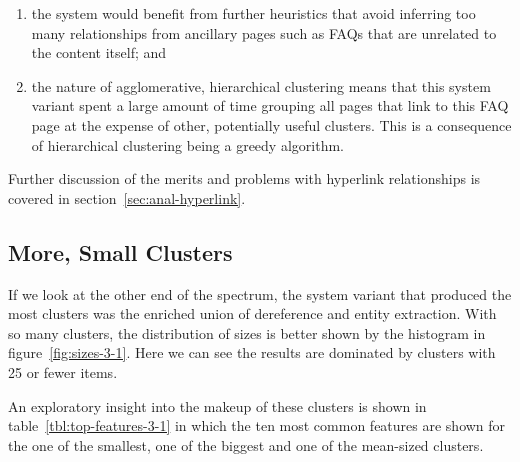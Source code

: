 \begin{enumerate}
\item the system would benefit from further heuristics that avoid
  inferring too many relationships from ancillary pages such as FAQs
  that are unrelated to the content itself; and
\item the nature of agglomerative, hierarchical clustering means
  that this system variant spent a large amount of time grouping all
  pages that link to this FAQ page at the expense of other,
  potentially useful clusters. This is a consequence of hierarchical
  clustering being a greedy algorithm.
\end{enumerate}

Further discussion of the merits and problems with hyperlink
relationships is covered in section~\ref{sec:anal-hyperlink}.

\subsection{More, Small Clusters}

If we look at the other end of the spectrum, the system variant
that produced the most clusters was the enriched union of dereference
and entity extraction. With so many clusters, the distribution of
sizes is better shown by the histogram in figure~\ref{fig:sizes-3-1}.
Here we can see the results are dominated by clusters with 25 or
fewer items.

\begin{sidewaysfigure}
  \caption{Distribution of cluster sizes produced by the enriched union of dereference and entity extraction}
  \label{fig:sizes-3-1}
\end{sidewaysfigure}

An exploratory insight into the makeup of these clusters is shown
in table~\ref{tbl:top-features-3-1} in which the ten most common
features are shown for the one of the smallest, one of the biggest
and one of the mean-sized clusters.

